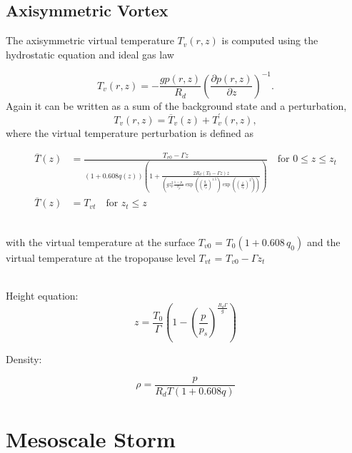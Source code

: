 \documentclass[times,doublespace]{fldauth}
\begin{document}
\subsection*{Axisymmetric Vortex}

The axisymmetric virtual temperature $T_v(r,z)$ is computed using the hydrostatic equation and ideal gas law


\begin{equation}
T_v(r,z) = -\frac{g p(r,z)}{R_d} \left( \frac{\partial p(r,z)}{ \partial z} \right)^{-1}.
\end{equation}  Again it can be written as a sum of the background state and a perturbation,
\begin{equation} \label{eq:virt_temp}
T_v(r,z) = \overline{T}_v(z) + T_v^\prime(r,z),
\end{equation} where the virtual temperature perturbation is defined as


\begin{equation}
\begin{split}
\overline{T}(z)&=\frac{T_{v0}-\Gamma z}{(1+0.608q(z))\left(1+\frac{2R_d(T_0-\Gamma z)z}{\left( g z_p^2\frac{1-p_s}{\delta_p}\exp\left(\left(\frac{g_r}{r_p}\right)^{1.5}\right)\exp\left(\left(\frac{z}{z_p}\right)^2\right) \right)}   \right)} \text{ ~~for   } 0 \leq z \leq z_t \\
\overline{T}(z)&=T_{vt}  \text{ ~~for   }  z_t \leq z
\end{split}
\end{equation}

~\\with the virtual temperature at the surface $T_{v0}$ = $T_0 (1+0.608 \, q_0)$ and the virtual temperature at the tropopause level $T_{vt}$ = $T_{v0} - \Gamma z_t$

~\\Height equation:
\begin{equation}
z=\frac{T_0}{\Gamma}\left(1-\left(\frac{p}{p_s}\right) ^{\frac{R_d\Gamma}{g}}\right)
\end{equation}




Density:

\begin{equation}
\rho=\frac{p}{R_dT(1+0.608q)}
\end{equation}

\clearpage

\section{Mesoscale Storm}  \label{sec:3}
\end{document}
